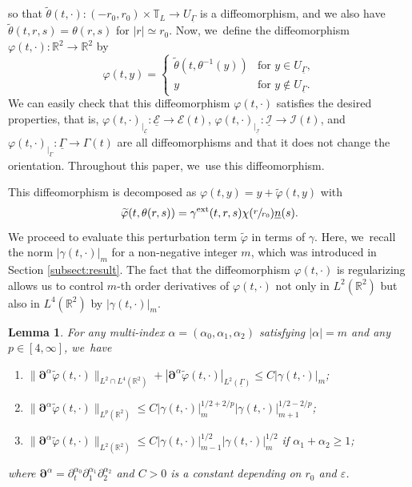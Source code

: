 \documentclass[JEP,XML,SOM,Unicode,NoFloatCountersInSection,published]{cedram}
\newenvironment{enumeratei}
{\bgroup\def\theenumi{\roman{enumi}}\def\theenumii{\arabic{enumii}}\begin{enumerate}}
{\end{enumerate}\egroup}
\newcommand{\R}{{\mathbb R}}
\newcommand{\dt}{\partial_t}
\newcommand{\cI}{{\mathcal I}}
\newcommand{\cE}{{\mathcal E}}
\newcommand{\ul}[1]{\underline{#1}}
\newcommand{\itGamma}{\mathit{\Gamma}}
\newtheorem{lemma}[theorem]{Lemma}
\theoremstyle{definition}
\begin{document}
so that $\tilde{\theta}(t,\cdot): (-r_0,r_0)\times\mathbb{T}_L \to U_{\ul{\itGamma}}$ is a diffeomorphism,
and we also have $\tilde{\theta}(t,r,s)=\theta(r,s)$ for $|r|\simeq r_0$.
Now, we~define the diffeomorphism $\varphi(t,\cdot) : \R^2 \to \R^2$ by
\begin{equation}\label{const phi}
\varphi(t,y) =
\begin{cases}
\tilde{\theta}(t,\theta^{-1}(y)) &\text{for } y \in U_{\ul{\itGamma}}, \\
y & \text{for } y \notin U_{\ul{\itGamma}}.
\end{cases}
\end{equation}
We can easily check that this diffeomorphism $\varphi(t,\cdot)$ satisfies the desired properties, that is,
$\varphi(t,\cdot)_{\vert_{\ul{\cE}}} : \ul{\cE}\to \cE(t)$, $\varphi(t,\cdot)_{\vert_{\ul{\cI}}} : \ul{\cI}\to \cI(t)$, and
$\varphi(t,\cdot)_{\vert_{\ul{\itGamma}}} : \ul{\itGamma}\to \itGamma(t)$ are all diffeomorphisms and that it does not change the orientation.
Throughout this paper, we~use this diffeomorphism.

This diffeomorphism is decomposed as $\varphi(t,y)=y+\widetilde{\varphi}(t,y)$ with
\[
\widetilde{\varphi}(t,\theta(r,s))=\gamma^{\rm ext}(t,r,s)\chi(\sfrac{r}{r_0})\ul{n}(s).
\]
We proceed to evaluate this perturbation term $\widetilde{\varphi}$ in terms of $\gamma$.
Here, we~recall the norm $|\gamma(t,\cdot)|_m$ for a non-negative integer $m$, which was introduced in Section \ref{subsect:result}.
The fact that the diffeomorphism $\varphi(t,\cdot)$ is regularizing allows us to control $m$-th order derivatives of $\varphi(t,\cdot)$
not only in $L^2(\R^2)$ but also in $L^4(\R^2)$ by $|\gamma(t,\cdot)|_m$.

\begin{lemma}\label{lem:EstDM}
For any multi-index $\alpha=(\alpha_0,\alpha_1,\alpha_2)$ satisfying $|\alpha|=m$ and any $p\in[4,\infty]$, we~have
\begin{enumeratei}
\item\label{lem:EstDMi}
$\|\bm{\partial}^\alpha\widetilde{\varphi}(t,\cdot)\|_{L^2\cap L^4(\R^2)} + |\bm{\partial}^\alpha\widetilde{\varphi}(t,\cdot)|_{L^2(\ul{\itGamma})}
\leq C|\gamma(t,\cdot)|_m$;
\item\label{lem:EstDMii}
$\|\bm{\partial}^\alpha\widetilde{\varphi}(t,\cdot)\|_{L^p(\R^2)}\leq C|\gamma(t,\cdot)|_m^{1/2+2/p}|\gamma(t,\cdot)|_{m+1}^{1/2-2/p}$;
\item\label{lem:EstDMiii}
$\|\bm{\partial}^\alpha\widetilde{\varphi}(t,\cdot)\|_{L^2(\R^2)}\leq C|\gamma(t,\cdot)|_{m-1}^{1/2}|\gamma(t,\cdot)|_m^{1/2}$ if $\alpha_1+\alpha_2\geq1$;
\end{enumeratei}
where $\bm{\partial}^\alpha=\dt^{\alpha_0}\partial_1^{\alpha_1}\partial_2^{\alpha_2}$ and $C>0$ is a constant depending on $r_0$ and $\varepsilon$.
\end{lemma}
\end{document}
